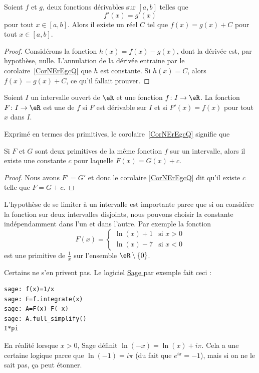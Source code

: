 \begin{corollary}   \label{CorNErEgcQ}
	Soient \( f\) et \( g\), deux fonctions dérivables sur \( [a,b]\) telles que
	\begin{equation}
		f'(x) = g'(x)
	\end{equation}
	pour tout \( x \in [a,b]\). Alors il existe un réel \( C\) tel que \( f (x) = g (x) + C\) pour tout \( x\in [a,b]\).
\end{corollary}

\begin{proof}
	Considérons la fonction \( h(x)=f(x)-g(x)\), dont la dérivée est, par hypothèse, nulle. L'annulation de la dérivée entraine par le corolaire~\ref{CorNErEgcQ} que \( h\) est  constante. Si \( h(x)=C\), alors \( f(x)=g(x)+C\), ce qu'il fallait prouver.
\end{proof}

\begin{definition}  \label{DefXVMVooWhsfuI}
	Soient \( I\) un intervalle ouvert de \( \eR\) et une fonction \( f\colon I\to \eR\). La fonction \( F\colon I\to \eR\) est une  de \( f\) si \( F\) est dérivable sur \( I\) et si \( F'(x)=f(x)\) pour tout \( x\) dans \( I\).
\end{definition}

Exprimé en termes des primitives, le corolaire~\ref{CorNErEgcQ} signifie que
\begin{corollary}  \label{CorZeroCst}
	Si \( F\) et \( G\) sont deux primitives de la même fonction \( f\) sur un intervalle, alors il existe une constante \( c\) pour laquelle \( F(x)=G(x)+c\).
\end{corollary}

\begin{proof}
	Nous avons \( F'=G'\) et donc le corolaire \ref{CorNErEgcQ} dit qu'il existe \( c\) telle que \( F=G+c\).
\end{proof}

\begin{remark}
	L'hypothèse de se limiter à un intervalle est importante parce que si on considère la fonction sur deux intervalles disjoints, nous pouvons choisir la constante indépendamment dans l'un et dans l'autre. Par exemple la fonction
	\begin{equation}
		F(x)=\begin{cases}
			\ln(x)+1 & \text{si } x>0 \\
			\ln(x)-7 & \text{si } x<0
		\end{cases}
	\end{equation}
	est une primitive de \( \frac{1}{ x }\) sur l'ensemble \( \eR\setminus\{ 0 \}\).

	Certains ne s'en privent pas. Le logiciel \href{https://www.sagemath.org}{ Sage } par exemple fait ceci :
	\begin{verbatim}
sage: f(x)=1/x
sage: F=f.integrate(x)
sage: A=F(x)-F(-x)
sage: A.full_simplify()
I*pi
    \end{verbatim}
	En réalité lorsque \( x>0\), Sage définit \( \ln(-x)=\ln(x)+i\pi\). Cela a une certaine logique parce que \( \ln(-1)=i\pi\) (du fait que \(  e^{i\pi}=-1\)), mais si on ne le sait pas, ça peut étonner.
\end{remark}

